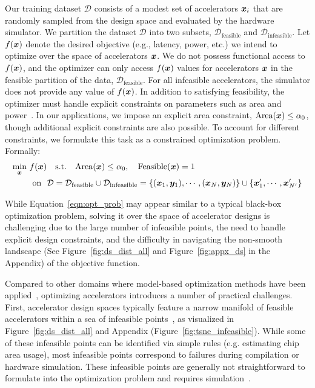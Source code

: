 Our training dataset $\mathcal{D}$ consists of a modest set of accelerators ${\boldsymbol{x}}_i$ that are randomly sampled from the design space and evaluated by the hardware simulator. We partition the dataset $\mathcal{D}$ into two subsets, $\mathcal{D}_\text{feasible}$ and $\mathcal{D}_\text{infeasible}$. Let $f({\boldsymbol{x}})$ denote the desired objective (e.g., latency, power, etc.) we intend to optimize over the space of accelerators ${\boldsymbol{x}}$. We do not possess functional access to $f({\boldsymbol{x}})$, and the optimizer can only access $f({\boldsymbol{x}})$ values for accelerators ${\boldsymbol{x}}$ in the feasible partition of the data, $\mathcal{D}_\text{feasible}$.
%
For all infeasible accelerators, the simulator does not provide any value of $f({\boldsymbol{x}})$.
In addition to satisfying feasibility, the optimizer must handle explicit constraints on parameters such as area and power~\citep{flynn2011computer}. In our applications, we impose an explicit area constraint, $\mathrm{Area}({\boldsymbol{x}}) \leq \alpha_0$, though additional explicit constraints are also possible. 
%
To account for different constraints, we formulate this task as a constrained optimization problem.
%
Formally:  
\begin{equation}
\label{eqn:opt_prob}
\vspace{-0.2cm}
\begin{aligned}
\min_{\rvx}~ & f(\rvx)
~~~\textrm{s.t.}~~~\mathrm{Area}(\rvx) \leq \review{\alpha_0}, ~~~ \mathrm{Feasible}(\rvx) = 1 \\
\quad &~\text{on}~~ \mathcal{D} = \mathcal{D}_\text{feasible} \cup \mathcal{D}_\text{infeasible} = \{(\rvx_1, \rvy_1), \cdots, (\rvx_N, \rvy_N)\} \cup \{\rvx'_1, \cdots, \rvx'_{N'}\}
\end{aligned}
\end{equation}

While Equation~\ref{eqn:opt_prob} may appear similar to a typical black-box optimization problem, solving it over the space of accelerator designs is challenging due to the large number of infeasible points, the need to handle explicit design constraints, and the difficulty in navigating the non-smooth landscape (See Figure~\ref{fig:ds_dist_all} and Figure~\ref{fig:appx_ds} in the Appendix) of the objective function.
%


 Compared to other domains where model-based optimization methods have been applied~\citep{brookes19a,trabucco2021conservative}, optimizing accelerators introduces a number of practical challenges.
%
First, accelerator design spaces typically feature a narrow manifold of feasible accelerators within a sea of infeasible points~\citep{prac_dse:mascots:2019,shi2020learned,gelbart2014bayesian}, as visualized in Figure~\ref{fig:ds_dist_all} and Appendix (Figure~\ref{fig:tsne_infeasible}).
%
While some of these infeasible points can be identified via simple rules (e.g. estimating chip area usage), most infeasible points correspond to failures during compilation or hardware simulation. These infeasible points are generally not straightforward to formulate into the optimization problem and requires simulation~\citep{shi2020learned,timeloop,yazdanbakhsh2021apollo}.

